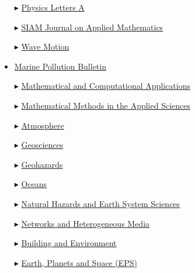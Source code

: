 \begin{itemize}
    \item[$\blacktriangleright$] \href{http://www.journals.elsevier.com/physics-letters-a/}{Physics Letters A}
    
    \item[$\blacktriangleright$] \href{http://www.siam.org/journals/siap.php}{SIAM Journal on Applied Mathematics}
  
    \item[$\blacktriangleright$] \href{http://www.elsevier.com/locate/wavemoti}%
    {Wave Motion}

    \item \href{https://www.sciencedirect.com/journal/marine-pollution-bulletin/}{Marine Pollution Bulletin}
    
    \item[$\blacktriangleright$] \href{https://www.mdpi.com/journal/mca}{Mathematical and Computational Applications}
    
    \item[$\blacktriangleright$] \href{https://onlinelibrary.wiley.com/journal/10991476/}{Mathematical Methods in the Applied Sciences}

    \item[$\blacktriangleright$] \href{https://www.mdpi.com/journal/atmosphere/}{Atmosphere}
    
    \item[$\blacktriangleright$] \href{https://www.mdpi.com/journal/geosciences/}{Geosciences}

    \item[$\blacktriangleright$] \href{https://www.mdpi.com/journal/geohazards/}{Geohazards}

    \item[$\blacktriangleright$] \href{https://www.mdpi.com/journal/oceans/}{Oceans}
    
    \item[$\blacktriangleright$] \href{http://www.nat-hazards-earth-syst-sci.net/}%
    {Natural Hazards and Earth System Sciences}

    \item[$\blacktriangleright$] \href{https://www.aimspress.com/journal/nhm/}{Networks and Heterogeneous Media}

    \item[$\blacktriangleright$] \href{https://www.sciencedirect.com/journal/building-and-environment}%
    {Building and Environment}
    
    \item[$\blacktriangleright$] \href{http://www.terrapub.co.jp/journals/EPS/}{Earth, Planets and Space (EPS)}
    

\end{itemize}
